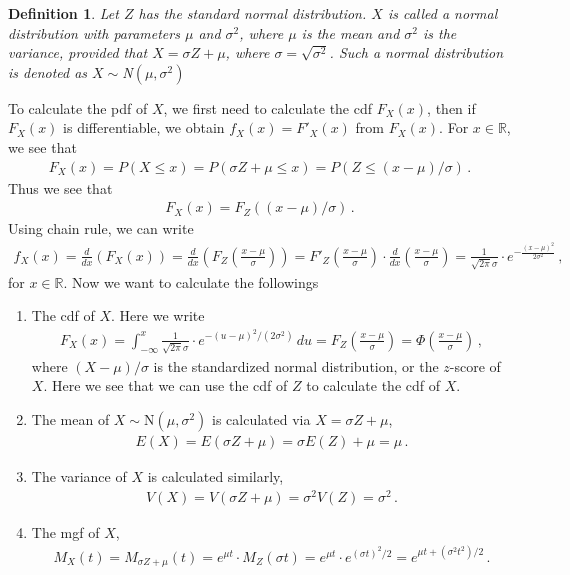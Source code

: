 \documentclass[11pt,oneside]{book}
\theoremstyle{newStyle}
\newtheorem{defn}[thm]{Definition}
\newcommand{\R}{\mathbb{R}}
\begin{document}
\begin{defn}
Let $Z$ has the standard normal distribution. $X$ is called a normal distribution with parameters $\mu$ and $\sigma^2$, where $\mu$ is the mean and $\sigma^2$ is the variance, provided that $X = \sigma Z + \mu$, where $\sigma = \sqrt{\sigma^2}$. Such a normal distribution is denoted as $X\sim $N$(\mu, \sigma^2)$
\end{defn}
 
To calculate the pdf of $X$, we first need to calculate the cdf $F_X(x)$, then if $F_X(x)$ is differentiable, we obtain $f_X(x) = F'_X(x)$ from $F_X(x)$. For $x \in \R$, we see that 
\begin{align*}
F_X(x) = P(X\leq x) = P(\sigma Z + \mu \leq x) = P(Z \leq (x-\mu)/\sigma)\,.\end{align*}
Thus we see that 
\begin{align*}
F_X(x) = F_Z((x-\mu)/\sigma)\,.
\end{align*}
Using chain rule, we can write
\begin{align*}
f_X(x) = \frac{d}{dx}\left( F_X(x)\right) = \frac{d}{dx}\left( F_Z\left( \frac{x-\mu}{\sigma}\right) \right) = F'_Z\left( \frac{x-\mu}{\sigma}\right) \cdot \frac{d}{dx}\left( \frac{x-\mu}{\sigma}\right) = \frac{1}{\sqrt{
2\pi}\sigma}\cdot e^{-\frac{(x-\mu)^2}{2\sigma^2}}\,,
\end{align*}
for $x \in \R$. Now we want to calculate the followings
\begin{enumerate}
\item The cdf of $X$. Here we write
\begin{align*}
F_X(x) = \int_{-\infty}^x \frac{1}{\sqrt{2\pi}\sigma}\cdot e^{-(u-\mu)^2/(2\sigma^2)}\, du = F_Z\left( \frac{x-\mu}{\sigma}\right) = \Phi\left( \frac{x-\mu}{\sigma}\right)\,,
\end{align*}
where $(X-\mu)/\sigma$ is the standardized normal distribution, or the $z$-score of $X$. Here we see that we can use the cdf of $Z$ to calculate the cdf of $X$. 
\item The mean of $X\sim$N$(\mu, \sigma^2)$ is calculated via $X = \sigma Z + \mu$, 
\begin{align*}
E(X) = E(\sigma Z + \mu) = \sigma E(Z) + \mu = \mu\,.
\end{align*}
\item The variance of $X$ is calculated similarly, 
\begin{align*}
V(X) = V(\sigma Z + \mu) = \sigma^2 V(Z) = \sigma^2\,.
\end{align*}
\item The mgf of $X$, 
\begin{align*}
M_X(t) = M_{\sigma Z + \mu}(t) = e^{\mu t}\cdot M_{Z}(\sigma t) = e^{\mu t} \cdot e^{(\sigma t)^2 /2} = e^{\mu t + (\sigma^2 t^2)/2}\,.
\end{align*}\\
\end{enumerate}
\end{document}
